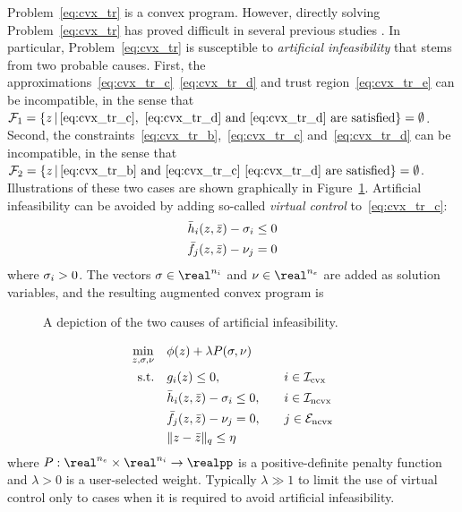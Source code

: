 \documentclass[letterpaper, 10 pt, conference]{ieeeconf}
\begin{document}
Problem~\eqref{eq:cvx_tr} is a convex program. However, directly solving Problem~\eqref{eq:cvx_tr} has proved difficult in several previous studies . In particular, Problem~\eqref{eq:cvx_tr} is susceptible to \textit{artificial infeasibility} that stems from two probable causes. First, the approximations~\eqref{eq:cvx_tr_c}~\eqref{eq:cvx_tr_d} and trust region~\eqref{eq:cvx_tr_e} can be incompatible, in the sense that $\mathcal{F}_1 = \{z\,|\,\eqref{eq:cvx_tr_c},~\eqref{eq:cvx_tr_d}\text{ and }\eqref{eq:cvx_tr_d}\text{ are satisfied}\} = \emptyset$. 
Second, the constraints~\eqref{eq:cvx_tr_b},~\eqref{eq:cvx_tr_c} and~\eqref{eq:cvx_tr_d} can be incompatible, in the sense that $\mathcal{F}_2 = \{z\,|\,\eqref{eq:cvx_tr_b}\text{ and }\eqref{eq:cvx_tr_c}~\eqref{eq:cvx_tr_d}\text{ are satisfied}\}=\emptyset$. Illustrations of these two cases are shown graphically in Figure~\ref{fig:artificial_infeas}. Artificial infeasibility can be avoided by adding so-called \textit{virtual control} to~\eqref{eq:cvx_tr_c}:
\begin{subequations}\label{eq:virtual_control}
\begin{align}
\bar{h}_i(z,\bar{z}) - \sigma_i \leq 0 \\
\bar{f}_j(z,\bar{z}) - \nu_j = 0
\end{align}
\end{subequations}
where $\sigma_i > 0$. The vectors $\vcc\in\real^{n_i}$ and $\vc\in\real^{n_e}$ are added as solution variables, and the resulting augmented convex program is%
\begin{figure}
\centering
\subfloat[$\mathcal{F}_1 = \emptyset$.]{} \hfil
\subfloat[$\mathcal{F}_2 = \emptyset$]{}
\caption{A depiction of the two causes of artificial infeasibility.}
\label{fig:artificial_infeas}
\end{figure}
\begin{subequations}\label{eq:cvx_apprx}
\begin{align}
\min_{\z,\vcc,\vc} &\quad \ocost(\z) + \lambda P(\vcc,\vc) &&\null \label{eq:cvx_apprx_a} \\
\text{s.t.} &\quad \fc_i(\z) \leq 0, &&\quad i\in\setIcvx \label{eq:cvx_apprx_b} \\
&\quad \fnib_i(\z,\zb) - \vcc_i \leq 0, &&\quad i\in\setIncvx \label{eq:cvx_apprx_c}\\
&\quad \fneb_j(\z,\zb) - \vc_j = 0, &&\quad j\in\setEncvx \label{eq:cvx_apprx_d} \\
&\quad \|\z-\zb\|_q \leq \tr &&\null  \label{eq:cvx_apprx_e}
\end{align}
\end{subequations}
where $P : \real^{n_e}\times\real^{n_i} \rightarrow \realpp$ is a positive-definite penalty function and $\lambda>0$ is a user-selected weight. Typically $\lambda \gg 1$ to limit the use of virtual control only to cases when it is required to avoid artificial infeasibility.
\end{document}
